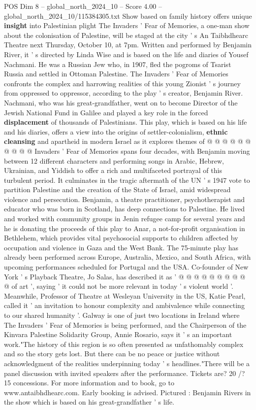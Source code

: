 \begin{textsample}{POS Dim 8 – global\_north\_2024\_10 – Score 4.00 – global\_north\_2024\_10/115384305.txt}  \label{ex:f8_pos_247}
Show based on family history offers unique \textbf{insight} into Palestinian plight The Invaders ' Fear of Memories, a one-man show about the colonisation of Palestine, will be staged at the city ' s An Taibhdhearc Theatre next Thursday, October 10, at 7pm.
Written and performed by Benjamin River, it ' s directed by Linda Wise and is based on the life and diaries of Yousef Nachmani.
He was a Russian Jew who, in 1907, fled the pogroms of Tsarist Russia and settled in Ottoman Palestine.
The Invaders ' Fear of Memories confronts the complex and harrowing realities of this young Zionist ' s journey from oppressed to oppressor, according to the play ' s creator, Benjamin River.
Nachmani, who was his great-grandfather, went on to become Director of the Jewish National Fund in Galilee and played a key role in the forced \textbf{displacement} of thousands of Palestinians.
This play, which is based on his life and his diaries, offers a view into the origins of settler-colonialism, \textbf{ethnic} \textbf{cleansing} and apartheid in modern Israel as it explores themes of @ @ @ @ @ @ @ @ @ @ Invaders ' Fear of Memories spans four decades, with Benjamin moving between 12 different characters and performing songs in Arabic, Hebrew, Ukrainian, and Yiddish to offer a rich and multifaceted portrayal of this turbulent period.
It culminates in the tragic aftermath of the UN ' s 1947 vote to partition Palestine and the creation of the State of Israel, amid widespread violence and persecution.
Benjamin, a theatre practitioner, psychotherapist and educator who was born in Scotland, has deep connections to Palestine.
He lived and worked with community groups in Jenin refugee camp for several years and he is donating the proceeds of this play to Anar, a not-for-profit organisation in Bethlehem, which provides vital psychosocial supports to children affected by occupation and violence in Gaza and the West Bank.
The 75-minute play has already been performed across Europe, Australia, Mexico, and South Africa, with upcoming performances scheduled for Portugal and the USA.
Co-founder of New York ' s Playback Theatre, Jo Salas, has described it as ' @ @ @ @ @ @ @ @ @ @ of art ', saying ' it could not be more relevant in today ' s violent world '.
Meanwhile, Professor of Theatre at Wesleyan University in the US, Katie Pearl, called it ' an invitation to honour complexity and ambivalence while connecting to our shared humanity '.
Galway is one of just two locations in Ireland where The Invaders ' Fear of Memories is being performed, and the Chairperson of the Kinvara Palestine Solidarity Group, Annie Rosario, says it ' s an important work."The history of this region is so often presented as unfathomably complex and so the story gets lost.
But there can be no peace or justice without acknowledgment of the realities underpinning today ' s headlines."There will be a panel discussion with invited speakers after the performance.
Tickets are? 20 /? 15 concessions.
For more information and to book, go to www.antaibhdhearc.com.
Early booking is advised.
Pictured : Benjamin Rivers in the show which is based on his great-grandfather ' s life.

\end{textsample}
